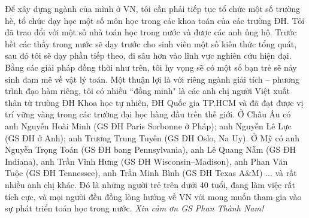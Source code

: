 \begin{multicols}{2}
	Để xây dựng ngành của mình ở VN, tôi cần phải tiếp tục tổ chức một số trường hè, tổ chức dạy học một số môn học trong các khoa toán của các trường ĐH. Tôi đã trao đổi với một số nhà toán học trong nước và được các anh ủng hộ. Trước hết các thầy trong nước sẽ dạy trước cho sinh viên một số kiến thức tổng quát, sau đó tôi sẽ dạy phần tiếp theo, đi sâu hơn vào lĩnh vực nghiên cứu hiện đại. Bằng các giải pháp đồng thời như trên, tôi hy vọng sẽ có một số bạn trẻ sẽ nảy sinh đam mê về vật lý toán.
	\vskip 0.1cm 
	Một thuận lợi là với riêng ngành giải tích -- phương trình đạo hàm riêng, tôi có nhiều ``đồng minh" là các anh chị người Việt xuất thân từ trường ĐH Khoa học tự nhiên, ĐH Quốc gia TP.HCM và đã đạt được vị trí vững vàng trong các trường đại học hàng đầu trên thế giới. Ở Châu Âu có anh Nguyễn Hoài Minh (GS ĐH Paris Sorbonne ở Pháp); anh Nguyễn Lê Lực (GS ĐH ở Anh); anh Trương Trung Tuyến (GS ĐH Oslo, Na Uy). Ở Mỹ có anh  Nguyễn Trọng Toán (GS ĐH bang Pennsylvania), anh Lê Quang Nẫm (GS ĐH Indiana), anh Trần Vĩnh Hưng (GS ĐH Wisconsin–Madison), anh Phan Văn  Tuộc (GS ĐH Tennessee), anh Trần Minh Bình (GS ĐH Texas A\&M) ... và rất nhiều anh chị khác. Đó là những người trẻ trên dưới $40$ tuổi, đang làm việc rất tích cực, và mọi người đều đồng lòng hướng về VN với mong muốn tham gia vào sự phát triển toán học trong nước.
	\vskip 0.1cm
	\textit{Xin cảm ơn GS Phan Thành Nam!} 
\end{multicols}